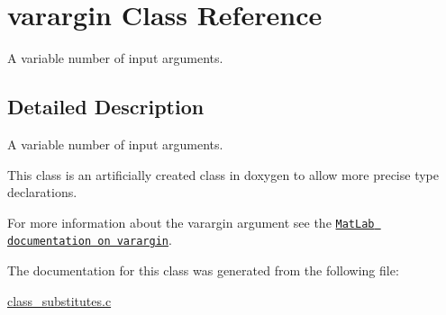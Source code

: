 \hypertarget{classvarargin}{\section{varargin Class Reference}
\label{classvarargin}
}


A variable number of input arguments.  




\subsection{Detailed Description}
A variable number of input arguments. 

This class is an artificially created class in doxygen to allow more precise type declarations.

For more information about the varargin argument see the \href{http://www.mathworks.de/help/techdoc/ref/varargin.html}{\tt Mat\-Lab documentation on varargin}. 

The documentation for this class was generated from the following file\-:\begin{DoxyCompactItemize}
\item 
\hyperlink{class__substitutes_8c}{class\-\_\-substitutes.\-c}\end{DoxyCompactItemize}
